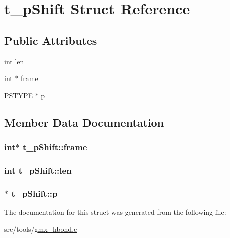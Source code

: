 \hypertarget{structt__pShift}{\section{t\-\_\-p\-Shift \-Struct \-Reference}
\label{structt__pShift}
}
\subsection*{\-Public \-Attributes}
\begin{DoxyCompactItemize}
\item 
int \hyperlink{structt__pShift_a026d379ded9dd3cf22677473dfbf4664}{len}
\item 
int $\ast$ \hyperlink{structt__pShift_a72e032cb915340912f543f8917c69e2c}{frame}
\item 
\hyperlink{gmx__hbond_8c_a098dc5fca1c0d52294fea24565555b87}{\-P\-S\-T\-Y\-P\-E} $\ast$ \hyperlink{structt__pShift_ab6127ea4c446f4cac62ff49cd560c538}{p}
\end{DoxyCompactItemize}


\subsection{\-Member \-Data \-Documentation}
\hypertarget{structt__pShift_a72e032cb915340912f543f8917c69e2c}{
\subsubsection[{frame}]{\setlength{\rightskip}{0pt plus 5cm}int$\ast$ {\bf t\-\_\-p\-Shift\-::frame}}}\label{structt__pShift_a72e032cb915340912f543f8917c69e2c}
\hypertarget{structt__pShift_a026d379ded9dd3cf22677473dfbf4664}{
\subsubsection[{len}]{\setlength{\rightskip}{0pt plus 5cm}int {\bf t\-\_\-p\-Shift\-::len}}}\label{structt__pShift_a026d379ded9dd3cf22677473dfbf4664}
\hypertarget{structt__pShift_ab6127ea4c446f4cac62ff49cd560c538}{
\subsubsection[{p}]{$\ast$ {\bf t\-\_\-p\-Shift\-::p}}}\label{structt__pShift_ab6127ea4c446f4cac62ff49cd560c538}


\-The documentation for this struct was generated from the following file\-:\begin{DoxyCompactItemize}
\item 
src/tools/\hyperlink{gmx__hbond_8c}{gmx\-\_\-hbond.\-c}\end{DoxyCompactItemize}
